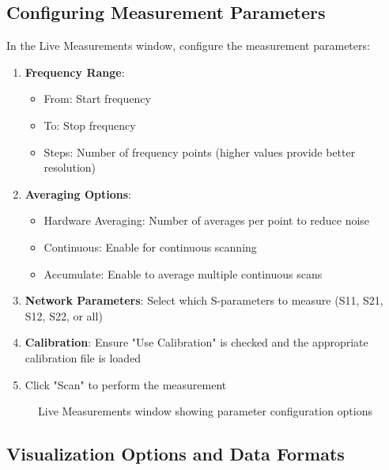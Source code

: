 \documentclass[12pt,a4paper]{article}
\begin{document}
\subsection{Configuring Measurement Parameters}

In the Live Measurements window, configure the measurement parameters:

\begin{enumerate}
    \item \textbf{Frequency Range}:
    \begin{itemize}
        \item From: Start frequency
        \item To: Stop frequency
        \item Steps: Number of frequency points (higher values provide better resolution)
    \end{itemize}
    
    \item \textbf{Averaging Options}:
    \begin{itemize}
        \item Hardware Averaging: Number of averages per point to reduce noise
        \item Continuous: Enable for continuous scanning
        \item Accumulate: Enable to average multiple continuous scans
    \end{itemize}
    
    \item \textbf{Network Parameters}: Select which S-parameters to measure (S11, S21, S12, S22, or all)
    
    \item \textbf{Calibration}: Ensure "Use Calibration" is checked and the appropriate calibration file is loaded
    
    \item Click "Scan" to perform the measurement
\end{enumerate}

\begin{figure}[H]
    \centering
    \caption{Live Measurements window showing parameter configuration options}
    \label{fig:live_config}
\end{figure}

\subsection{Visualization Options and Data Formats}
\end{document}
